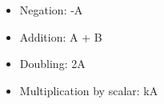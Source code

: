 \begin{itemize}
  \item Negation: -A
  \item Addition: A + B
  \item Doubling: 2A
  \item Multiplication by scalar: kA
\end{itemize}
